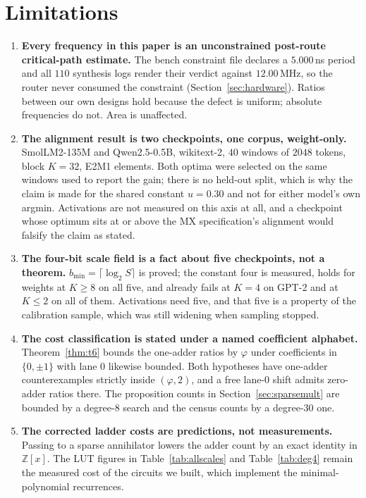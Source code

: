 \documentclass[11pt]{article}
\theoremstyle{definition}
\begin{document}
\section{Limitations}
\label{sec:limits}

\begin{enumerate}[leftmargin=*]
\item \textbf{Every frequency in this paper is an unconstrained post-route
critical-path estimate.} The bench constraint file declares a $5.000$\,ns period
and all $110$ synthesis logs render their verdict against $12.00$\,MHz, so the
router never consumed the constraint (Section~\ref{sec:hardware}). Ratios between
our own designs hold because the defect is uniform; absolute frequencies do not.
Area is unaffected.

\item \textbf{The alignment result is two checkpoints, one corpus, weight-only.}
SmolLM2-135M and Qwen2.5-0.5B, wikitext-2, $40$ windows of $2048$ tokens, block
$K=32$, E2M1 elements. Both optima were selected on the same windows used to
report the gain; there is no held-out split, which is why the claim is made for
the shared constant $u=0.30$ and not for either model's own argmin. Activations
are not measured on this axis at all, and a checkpoint whose optimum sits at or
above the MX specification's alignment would falsify the claim as stated.

\item \textbf{The four-bit scale field is a fact about five checkpoints, not a
theorem.} $b_{\min} = \lceil\log_2 S\rceil$ is proved; the constant four is
measured, holds for weights at $K\ge8$ on all five, and already fails at $K=4$ on
GPT-2 and at $K\le2$ on all of them. Activations need five, and that five is a
property of the calibration sample, which was still widening when sampling
stopped.

\item \textbf{The cost classification is stated under a named coefficient
alphabet.} Theorem~\ref{thm:t6} bounds the one-adder ratios by $\varphi$ under
coefficients in $\{0,\pm1\}$ with lane $0$ likewise bounded. Both hypotheses have
one-adder counterexamples strictly inside $(\varphi,2)$, and a free lane-$0$
shift admits zero-adder ratios there. The proposition counts in
Section~\ref{sec:sparsemult} are bounded by a degree-$8$ search and the census
counts by a degree-$30$ one.

\item \textbf{The corrected ladder costs are predictions, not measurements.}
Passing to a sparse annihilator lowers the adder count by an exact identity in
$\mathbb{Z}[x]$. The LUT figures in Table~\ref{tab:allscales} and
Table~\ref{tab:deg4} remain the measured cost of the circuits we built, which
implement the minimal-polynomial recurrences.


\end{enumerate}
\end{document}
